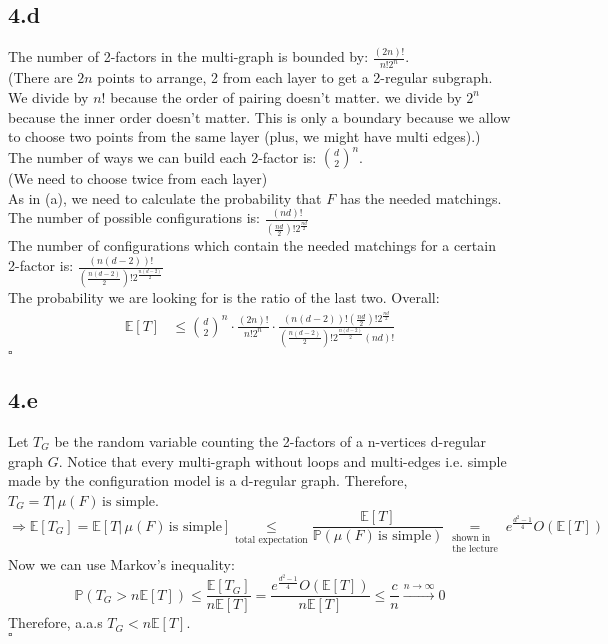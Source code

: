 \documentclass{article}
\begin{document}
\subsection*{4.d}
The number of 2-factors in the multi-graph is bounded by: $\frac{(2n)!}{n!2^n}$.\\
(There are $2n$ points to arrange, 2 from each layer to get a 2-regular subgraph. We divide by $n!$ because the order of pairing doesn't matter. we divide by $2^n$ because the inner order doesn't matter. This is only a boundary because we allow to choose two points from the same layer (plus, we might have multi edges).)\\
The number of ways we can build each 2-factor is: $\binom{d}{2}^n$.\\
(We need to choose twice from each layer)\\
As in (a), we need to calculate the probability that $F$ has the needed matchings.\\
The number of possible configurations is: $\frac{(nd)!}{(\tfrac{nd}{2})!2^{\tfrac{nd}{2}}}$\\
The number of configurations which contain the needed matchings for a certain 2-factor is: $\frac{(n(d-2))!}{(\tfrac{n(d-2)}{2})!2^{\tfrac{n(d-2)}{2}}}$\\
The probability we are looking for is the ratio of the last two. Overall:\\
\begin{align*}
\mathbb{E}[T] 
  &\leq \binom{d}{2}^n\cdot \frac{(2n)!}{n!2^n} \cdot \frac{(n(d-2))!(\tfrac{nd}{2})!2^{\tfrac{nd}{2}}}{(\tfrac{n(d-2)}{2})!2^{\tfrac{n(d-2)}{2}}(nd)!}
\end{align*}
\hfill $\square$

\subsection*{4.e}
Let $T_G$ be the random variable counting the 2-factors of a n-vertices d-regular graph $G$. Notice that every multi-graph without loops and multi-edges i.e. simple made by the configuration model is a d-regular graph. Therefore, $T_G = T | \, \mu(F) \, \text{is simple}$.\\
\[
\Longrightarrow{} \mathbb{E}[T_G]=\mathbb{E}[T | \, \mu(F) \, \text{is simple}]\underset{\text{total expectation}}{\leq} \frac{\mathbb{E}[T]}{\mathbb{P}(\mu(F) \, \text{is simple})}\underset{\substack{\text{shown in } \\ \text{the lecture}}}{= }e^{\tfrac{d^2-1}{4}} O(\mathbb{E}[T])
\]
Now we can use Markov's inequality:\\
\[
\mathbb{P}(T_G>n\mathbb{E}[T])\leq\frac{\mathbb{E}[T_G]}{n\mathbb{E}[T]}=\frac{e^{\tfrac{d^2-1}{4}} O(\mathbb{E}[T])}{n\mathbb{E}[T]} \leq \frac{c}{n}\xrightarrow{n \to \infty}0
\]
Therefore, a.a.s $T_G<n\mathbb{E}[T]$.\\
\text{                                        }\hfill $\square$
\end{document}
